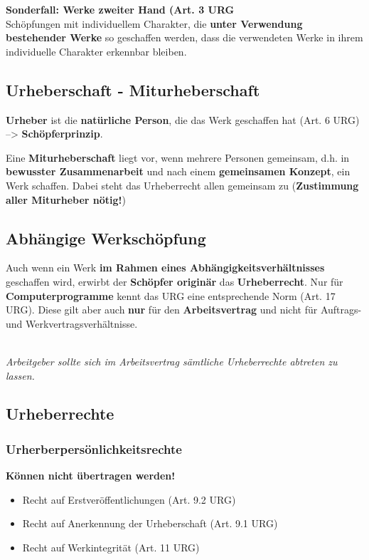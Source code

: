 \textbf{Sonderfall: Werke zweiter Hand (Art. 3 URG}\\
Schöpfungen mit individuellem Charakter, die \textbf{unter Verwendung
bestehender Werke} so geschaffen werden, dass die verwendeten Werke in
ihrem individuelle Charakter erkennbar bleiben.

\subsection{Urheberschaft - Miturheberschaft}
\label{sec:Urheberrecht-UrheberschaftMiturheberschaft}

\textbf{Urheber} ist die \textbf{natürliche Person}, die das Werk
geschaffen hat (Art. 6 URG) --> \textbf{Schöpferprinzip}.

Eine \textbf{Miturheberschaft} liegt vor, wenn mehrere Personen
gemeinsam, d.h. in \textbf{bewusster Zusammenarbeit} und nach einem
\textbf{gemeinsamen Konzept}, ein Werk schaffen. Dabei steht das
Urheberrecht allen gemeinsam zu (\textbf{Zustimmung aller Miturheber
nötig!})

\subsection{Abhängige Werkschöpfung}
\label{sec:Urheberrecht-AbhängigeWerkschöpfung}
Auch wenn ein Werk \textbf{im Rahmen eines Abhängigkeitsverhältnisses}
geschaffen wird, erwirbt der \textbf{Schöpfer originär} das
\textbf{Urheberrecht}. Nur für \textbf{Computerprogramme} kennt das URG
eine entsprechende Norm (Art. 17 URG). Diese gilt aber auch \textbf{nur}
für den \textbf{Arbeitsvertrag} und nicht für Auftrags- und
Werkvertragsverhältnisse.

\mbox{}\\
\emph{Arbeitgeber sollte sich im Arbeitsvertrag sämtliche Urheberrechte
abtreten zu lassen.}


\subsection{Urheberrechte}

\subsubsection{Urherberpersönlichkeitsrechte}
\label{sec:Urheberrecht-Urherberpersönlichkeitsrechte}
\textbf{Können nicht übertragen werden!}

\begin{itemize}
	\tightlist
	\item Recht auf Erstveröffentlichungen (Art. 9.2 URG)
	\item Recht auf Anerkennung der Urheberschaft (Art. 9.1 URG)
	\item Recht auf Werkintegrität (Art. 11 URG)
\end{itemize}

